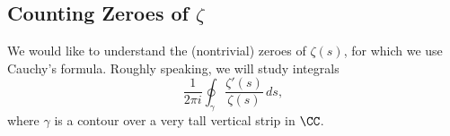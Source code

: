 \documentclass[../notes.tex]{subfiles}
\begin{document}

\subsection{Counting Zeroes of \texorpdfstring{$\zeta$}{ Zeta}}
We would like to understand the (nontrivial) zeroes of $\zeta(s)$, for which we use Cauchy's formula. Roughly speaking, we will study integrals
\[\frac1{2\pi i}\oint_\gamma\frac{\zeta'(s)}{\zeta(s)}\,ds,\]
where $\gamma$ is a contour over a very tall vertical strip in $\CC$.
\end{document}
